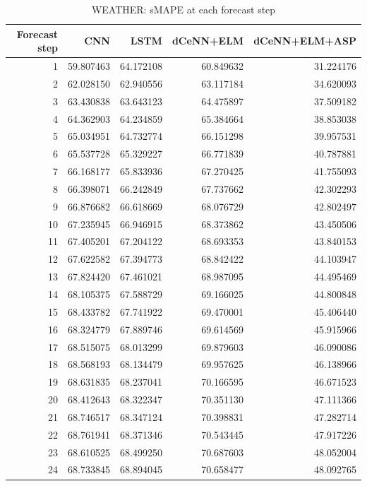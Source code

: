 \begin{table}
\caption{WEATHER: sMAPE at each forecast step}
\begin{tabular}{rrrrr}
\toprule
Forecast step & CNN & LSTM & dCeNN+ELM & dCeNN+ELM+ASP \\
\midrule
1 & 59.807463 & 64.172108 & 60.849632 & 31.224176 \\
2 & 62.028150 & 62.940556 & 63.117184 & 34.620093 \\
3 & 63.430838 & 63.643123 & 64.475897 & 37.509182 \\
4 & 64.362903 & 64.234859 & 65.384664 & 38.853038 \\
5 & 65.034951 & 64.732774 & 66.151298 & 39.957531 \\
6 & 65.537728 & 65.329227 & 66.771839 & 40.787881 \\
7 & 66.168177 & 65.833936 & 67.270425 & 41.755093 \\
8 & 66.398071 & 66.242849 & 67.737662 & 42.302293 \\
9 & 66.876682 & 66.618669 & 68.076729 & 42.802497 \\
10 & 67.235945 & 66.946915 & 68.373862 & 43.450506 \\
11 & 67.405201 & 67.204122 & 68.693353 & 43.840153 \\
12 & 67.622582 & 67.394773 & 68.842422 & 44.103947 \\
13 & 67.824420 & 67.461021 & 68.987095 & 44.495469 \\
14 & 68.105375 & 67.588729 & 69.166025 & 44.800848 \\
15 & 68.433782 & 67.741922 & 69.470001 & 45.406440 \\
16 & 68.324779 & 67.889746 & 69.614569 & 45.915966 \\
17 & 68.515075 & 68.013299 & 69.879603 & 46.090086 \\
18 & 68.568193 & 68.134479 & 69.957625 & 46.138966 \\
19 & 68.631835 & 68.237041 & 70.166595 & 46.671523 \\
20 & 68.412643 & 68.322347 & 70.351130 & 47.111366 \\
21 & 68.746517 & 68.347124 & 70.398831 & 47.282714 \\
22 & 68.761941 & 68.371346 & 70.543445 & 47.917226 \\
23 & 68.610525 & 68.499250 & 70.687603 & 48.052004 \\
24 & 68.733845 & 68.894045 & 70.658477 & 48.092765 \\
\bottomrule
\end{tabular}
\end{table}
